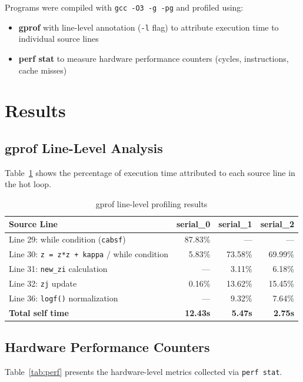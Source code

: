 \documentclass[11pt]{article}
\begin{document}
Programs were compiled with \texttt{gcc -O3 -g -pg} and profiled using:
\begin{itemize}
    \item \textbf{gprof} with line-level annotation (\texttt{-l} flag) to attribute execution time to individual source lines
    \item \textbf{perf stat} to measure hardware performance counters (cycles, instructions, cache misses)
\end{itemize}

\section{Results}

\subsection{gprof Line-Level Analysis}

Table~\ref{tab:gprof} shows the percentage of execution time attributed to each source line in the hot loop.

\begin{table}[h]
\centering
\caption{gprof line-level profiling results}
\label{tab:gprof}
\begin{tabular}{@{}lrrr@{}}
\toprule
\textbf{Source Line} & \textbf{serial\_0} & \textbf{serial\_1} & \textbf{serial\_2} \\
\midrule
Line 29: while condition (\texttt{cabsf}) & 87.83\% & --- & --- \\
Line 30: \texttt{z = z*z + kappa} / while condition & 5.83\% & 73.58\% & 69.99\% \\
Line 31: \texttt{new\_zi} calculation & --- & 3.11\% & 6.18\% \\
Line 32: \texttt{zj} update & 0.16\% & 13.62\% & 15.45\% \\
Line 36: \texttt{logf()} normalization & --- & 9.32\% & 7.64\% \\
\midrule
\textbf{Total self time} & \textbf{12.43s} & \textbf{5.47s} & \textbf{2.75s} \\
\bottomrule
\end{tabular}
\end{table}

\subsection{Hardware Performance Counters}

Table~\ref{tab:perf} presents the hardware-level metrics collected via \texttt{perf stat}.
\end{document}
